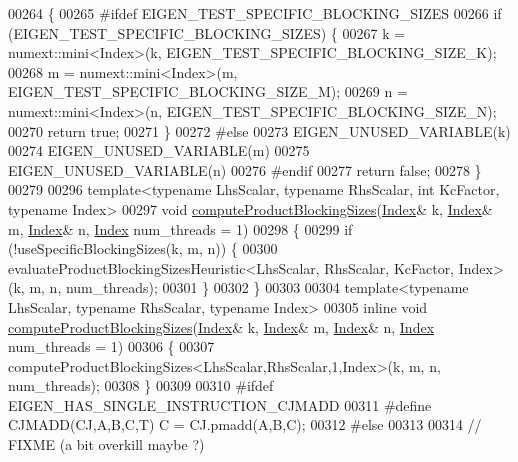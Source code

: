 \begin{DoxyCode}
00264 \{
00265 \textcolor{preprocessor}{#ifdef EIGEN\_TEST\_SPECIFIC\_BLOCKING\_SIZES}
00266   \textcolor{keywordflow}{if} (EIGEN\_TEST\_SPECIFIC\_BLOCKING\_SIZES) \{
00267     k = numext::mini<Index>(k, EIGEN\_TEST\_SPECIFIC\_BLOCKING\_SIZE\_K);
00268     m = numext::mini<Index>(m, EIGEN\_TEST\_SPECIFIC\_BLOCKING\_SIZE\_M);
00269     n = numext::mini<Index>(n, EIGEN\_TEST\_SPECIFIC\_BLOCKING\_SIZE\_N);
00270     \textcolor{keywordflow}{return} \textcolor{keyword}{true};
00271   \}
00272 \textcolor{preprocessor}{#else}
00273   EIGEN\_UNUSED\_VARIABLE(k)
00274   EIGEN\_UNUSED\_VARIABLE(m)
00275   EIGEN\_UNUSED\_VARIABLE(n)
00276 \textcolor{preprocessor}{#endif}
00277   \textcolor{keywordflow}{return} \textcolor{keyword}{false};
00278 \}
00279 
00296 \textcolor{keyword}{template}<\textcolor{keyword}{typename} LhsScalar, \textcolor{keyword}{typename} RhsScalar, \textcolor{keywordtype}{int} KcFactor, \textcolor{keyword}{typename} Index>
00297 \textcolor{keywordtype}{void} \hyperlink{namespace_eigen_1_1internal_a85af7f706f2ecd66aaa5a088fc32cbcc}{computeProductBlockingSizes}(\hyperlink{namespace_eigen_a62e77e0933482dafde8fe197d9a2cfde}{Index}& k, \hyperlink{namespace_eigen_a62e77e0933482dafde8fe197d9a2cfde}{Index}& m, 
      \hyperlink{namespace_eigen_a62e77e0933482dafde8fe197d9a2cfde}{Index}& n, \hyperlink{namespace_eigen_a62e77e0933482dafde8fe197d9a2cfde}{Index} num\_threads = 1)
00298 \{
00299   \textcolor{keywordflow}{if} (!useSpecificBlockingSizes(k, m, n)) \{
00300     evaluateProductBlockingSizesHeuristic<LhsScalar, RhsScalar, KcFactor, Index>(k, m, n, num\_threads);
00301   \}
00302 \}
00303 
00304 \textcolor{keyword}{template}<\textcolor{keyword}{typename} LhsScalar, \textcolor{keyword}{typename} RhsScalar, \textcolor{keyword}{typename} Index>
00305 \textcolor{keyword}{inline} \textcolor{keywordtype}{void} \hyperlink{namespace_eigen_1_1internal_a85af7f706f2ecd66aaa5a088fc32cbcc}{computeProductBlockingSizes}(\hyperlink{namespace_eigen_a62e77e0933482dafde8fe197d9a2cfde}{Index}& k, 
      \hyperlink{namespace_eigen_a62e77e0933482dafde8fe197d9a2cfde}{Index}& m, \hyperlink{namespace_eigen_a62e77e0933482dafde8fe197d9a2cfde}{Index}& n, \hyperlink{namespace_eigen_a62e77e0933482dafde8fe197d9a2cfde}{Index} num\_threads = 1)
00306 \{
00307   computeProductBlockingSizes<LhsScalar,RhsScalar,1,Index>(k, m, n, num\_threads);
00308 \}
00309 
00310 \textcolor{preprocessor}{#ifdef EIGEN\_HAS\_SINGLE\_INSTRUCTION\_CJMADD}
00311 \textcolor{preprocessor}{  #define CJMADD(CJ,A,B,C,T)  C = CJ.pmadd(A,B,C);}
00312 \textcolor{preprocessor}{#else}
00313 
00314   \textcolor{comment}{// FIXME (a bit overkill maybe ?)}

\end{DoxyCode}
